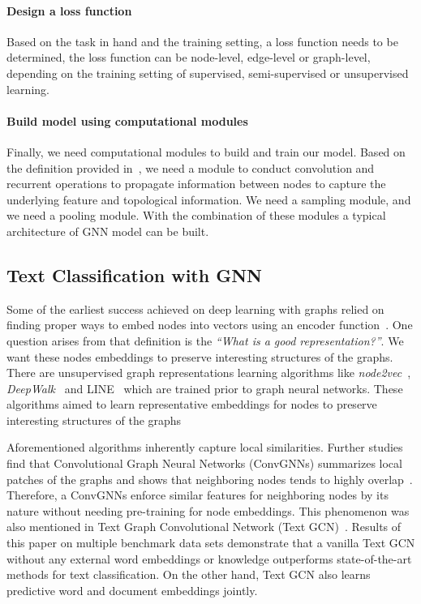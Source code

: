 \paragraph{Design a loss function}
Based on the task in hand and the training setting, a loss function needs to be determined, the loss function can be node-level, edge-level or graph-level, depending on the training setting of supervised, semi-supervised or unsupervised learning.

\paragraph{Build model using computational modules}
Finally, we need computational modules to build and train our model. Based on the definition provided in~\autocite{zhou20gnn}, we need a module to conduct convolution and recurrent operations to propagate information between nodes to capture the underlying feature and topological information. We need a sampling module, and we need a pooling module. With the combination of these modules a typical architecture of GNN model can be built.

\subsection{Text Classification with GNN}\label{sec:related:tc_with_gnn}
Some of the earliest success achieved on deep learning with graphs relied on finding proper ways to embed nodes into vectors using an encoder function~\autocite{velickovic21gnn}. One question arises from that definition is the \emph{``What is a good representation?''}. We want these nodes embeddings to preserve interesting structures of the graphs. There are unsupervised graph representations learning algorithms like \emph{node2vec}~\autocite{node2vec}, \emph{DeepWalk}~\autocite{deepwalk2014} and LINE~\autocite{line2015} which are trained prior to graph neural networks. These algorithms aimed to learn representative embeddings for nodes to preserve interesting structures of the graphs

Aforementioned algorithms inherently capture local similarities. Further studies find that Convolutional Graph Neural Networks (ConvGNNs) summarizes local patches of the graphs and shows that neighboring nodes tends to highly overlap~\autocite{velickovic21gnn}. Therefore, a ConvGNNs enforce similar features for neighboring nodes by its nature without needing pre-training for node embeddings. This phenomenon was also mentioned in Text Graph Convolutional Network (Text GCN)~\autocite{yao18graph}. Results of this paper on multiple benchmark data sets demonstrate that a vanilla Text GCN without any external word embeddings or knowledge outperforms state-of-the-art methods for text classification. On the other hand, Text GCN also learns predictive word and document embeddings jointly.

